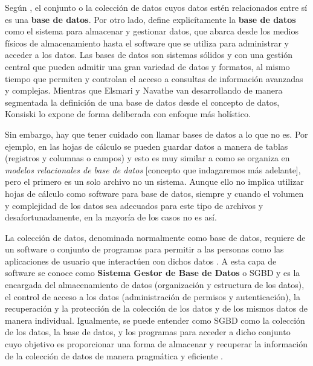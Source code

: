 \documentclass[12pt]{article}
\begin{document}
Según \textcite{Elmasri2007}, el conjunto o la colección de datos cuyos datos estén relacionados entre sí es una \textbf{base de datos}. Por otro lado, \textcite{ibm} define explicítamente la \textbf{base de datos} como el sistema para almacenar y gestionar datos, que abarca desde los medios físicos de almacenamiento hasta el software que se utiliza para administrar y acceder a los datos. Las bases de datos son sistemas sólidos y con una gestión central que pueden admitir una gran variedad de datos y formatos, al mismo tiempo que permiten y controlan el acceso a consultas de información avanzadas y complejas. Mientras que Elsmari y Navathe van desarrollando de manera segmentada la definición de una base de datos desde el concepto de datos, Konsiski lo expone de forma deliberada con enfoque más holístico.
\newline

Sin embargo, hay que tener cuidado con llamar bases de datos a lo que no es. Por ejemplo, en las hojas de cálculo se pueden guardar datos a manera de tablas (registros y columnas o campos) y esto es muy similar a como se organiza en \textit{modelos relacionales de base de datos} [concepto que indagaremos más adelante], pero el primero es un solo archivo no un sistema. Aunque ello no implica utilizar hojas de cálculo como software para base de datos, siempre y cuando el volumen y complejidad de los datos sea adecuados para este tipo de archivos y desafortunadamente, en la mayoría de los casos no es así.
\newline


La colección de datos, denominada normalmente como base de datos, requiere de un software o conjunto de programas para permitir a las personas como las aplicaciones de usuario que interactúen con dichos datos \parencite{microsoft, Elmasri2007}. A esta capa de software se conoce como \textbf{Sistema Gestor de Base de Datos} o SGBD y es la encargada del almacenamiento de datos (organización y estructura de los datos), el control de acceso a los datos (administración de permisos y autenticación), la recuperación y la protección de la colección de los datos y de los mismos datos de manera individual. Igualmente, se puede entender como SGBD como la colección de los datos, la base de datos, y los programas para acceder a dicho conjunto cuyo objetivo es proporcionar una forma de almacenar y recuperar la información de la colección de datos de manera pragmática y eficiente \parencite{Silberschatz2014}.
\newline
\end{document}
